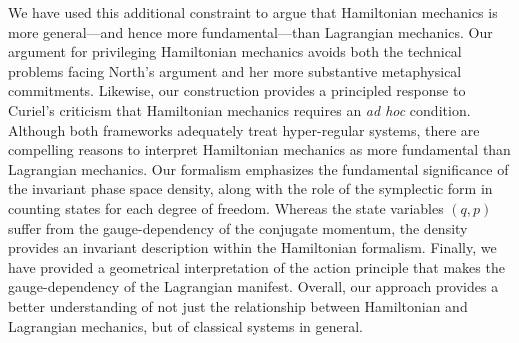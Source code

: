 \documentclass[12pt, english, twoside]{article} %
\begin{document}
We have used this additional constraint to argue that Hamiltonian mechanics is more general---and hence more fundamental---than Lagrangian mechanics. Our argument for privileging Hamiltonian mechanics avoids both the technical problems facing North's \parencites*[]{North} argument and her more substantive metaphysical commitments. Likewise, our construction provides a principled response to Curiel's \parencites*[]{Curiel} criticism that Hamiltonian mechanics requires an \textit{ad hoc} condition. Although both frameworks adequately treat hyper-regular systems, there are compelling reasons to interpret Hamiltonian mechanics as more fundamental than Lagrangian mechanics. Our formalism emphasizes the fundamental significance of the invariant phase space density, along with the role of the symplectic form in counting states for each degree of freedom. Whereas the state variables $(q, p)$ suffer from the gauge-dependency of the conjugate momentum, the density provides an invariant description within the Hamiltonian formalism. Finally, we have provided a geometrical interpretation of the action principle that makes the gauge-dependency of the Lagrangian manifest. Overall, our approach provides a better understanding of not just the relationship between Hamiltonian and Lagrangian mechanics, but of classical systems in general.


\end{document}
